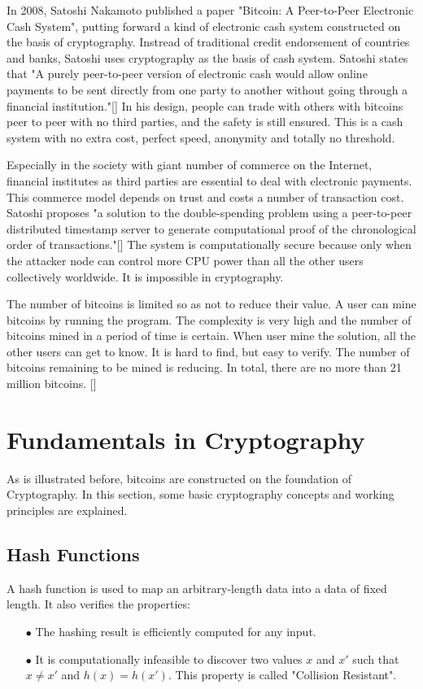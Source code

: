 \documentclass[12pt,a4paper]{article}
\begin{document}
In 2008, Satoshi Nakamoto published a paper "Bitcoin: A Peer-to-Peer Electronic Cash System", putting forward a kind of electronic cash system constructed on the basis of cryptography. Instread of traditional credit endorsement of countries and banks, Satoshi uses cryptography as the basis of cash system. Satoshi states that "A purely peer-to-peer version of electronic cash would allow online payments to be sent directly from one party to another without going through a financial institution."[] In his design, people can trade with others with bitcoins peer to peer with no third parties, and the safety is still ensured. This is a cash system with no extra cost, perfect speed, anonymity and totally no threshold.  

Especially in the society with giant number of commerce on the Internet, financial institutes as third parties are essential to deal with electronic payments. This commerce model depends on trust and costs a number of transaction cost. Satoshi proposes "a solution to the double-spending problem using a peer-to-peer distributed timestamp server to generate computational proof of the chronological order of transactions."[] The system is computationally secure because only when the attacker node can control more CPU power than all the other users collectively worldwide. It is impossible in cryptography.

The number of bitcoins is limited so as not to reduce their value. A user can mine bitcoins by running the program. The complexity is very high and the number of bitcoins mined in a period of time is certain. When user mine the solution, all the other users can get to know. It is hard to find, but easy to verify. The number of bitcoins remaining to be mined is reducing. In total, there are no more than 21 million bitcoins. []

\section{Fundamentals in Cryptography}

As is illustrated before, bitcoins are constructed on the foundation of Cryptography. In this section, some basic cryptography concepts and working principles are explained.

\subsection{Hash Functions}

A hash function is used to map an arbitrary-length data into a data of fixed length. It also verifies the properties:
\begin{enumerate}
    \item [$\bullet$] The hashing result is efficiently computed for any input.
    \item [$\bullet$] It is computationally infeasible to discover two values $x$ and $x'$ such that $x \neq x'$ and $h(x) = h(x')$. This property is called "Collision Resistant".
\end{enumerate}
\end{document}
